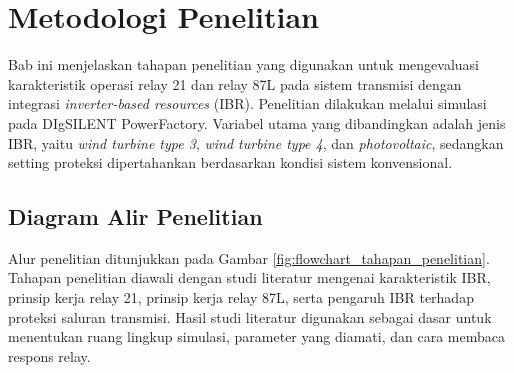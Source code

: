 \chapter{Metodologi Penelitian}

Bab ini menjelaskan tahapan penelitian yang digunakan untuk mengevaluasi karakteristik operasi relay 21 dan relay 87L pada sistem transmisi dengan integrasi \textit{inverter-based resources} (IBR). Penelitian dilakukan melalui simulasi pada DIgSILENT PowerFactory. Variabel utama yang dibandingkan adalah jenis IBR, yaitu \textit{wind turbine type 3}, \textit{wind turbine type 4}, dan \textit{photovoltaic}, sedangkan setting proteksi dipertahankan berdasarkan kondisi sistem konvensional.

\section{Diagram Alir Penelitian}

Alur penelitian ditunjukkan pada Gambar \ref{fig:flowchart_tahapan_penelitian}. Tahapan penelitian diawali dengan studi literatur mengenai karakteristik IBR, prinsip kerja relay 21, prinsip kerja relay 87L, serta pengaruh IBR terhadap proteksi saluran transmisi. Hasil studi literatur digunakan sebagai dasar untuk menentukan ruang lingkup simulasi, parameter yang diamati, dan cara membaca respons relay.

\usetikzlibrary{shapes.geometric, arrows.meta, positioning}


